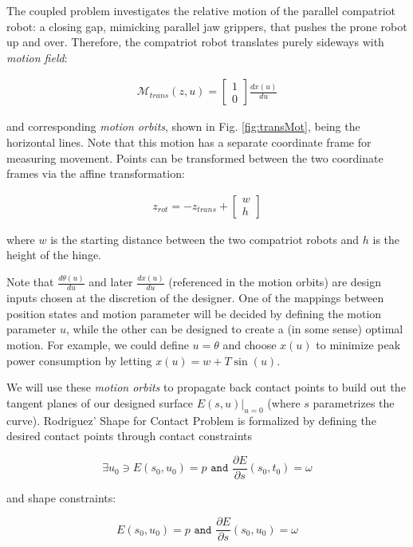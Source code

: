 \documentclass[letterpaper]{report}
\begin{document}
The coupled problem investigates the relative motion of the parallel compatriot robot: a closing gap, mimicking parallel jaw grippers, that pushes the prone robot up and over.
Therefore, the compatriot robot translates purely sideways with \textit{motion field}:

\begin{align}
\mathcal{M}_{trans}(z,u) = \begin{bmatrix} 1 \\ 0 \end{bmatrix} \frac{dx(u)}{du}
\end{align}

and corresponding \textit{motion orbits}, shown in Fig. \ref{fig:transMot}, being the horizontal lines.
Note that this motion has a separate coordinate frame for measuring movement.
Points can be transformed between the two coordinate frames via the affine transformation:

\begin{align}
 z_{rot}=-z_{trans}+\begin{bmatrix}w \\ h\end{bmatrix}
\end{align}

where $w$ is the starting distance between the two compatriot robots and $h$ is the height of the hinge.

Note that $\frac{d\theta(u)}{du}$ and later $\frac{dx(u)}{du}$ (referenced in the motion orbits) are design inputs chosen at the discretion of the designer.
One of the mappings between position states and motion parameter will be decided by defining the motion parameter $u$, while the other can be designed to create a (in some sense) optimal motion.
For example, we could define $u=\theta$ and choose $x(u)$ to minimize peak power consumption by letting $x(u) = w + T \sin(u)$.

We will use these \textit{motion orbits} to propagate back contact points to build out the tangent planes of our designed surface $E(s,u)\rvert_{u=0}$ (where $s$ parametrizes the curve).
Rodriguez' Shape for Contact Problem is formalized by defining the desired contact points through contact constraints

$$\exists u_0 \ni E(s_0,u_0) = p \texttt{ and } \frac{\partial E}{\partial s}(s_0,t_0) = \omega$$

and shape constraints:

$$E(s_0,u_0) = p \texttt{ and } \frac{\partial E}{\partial s}(s_0,u_0) = \omega$$
\end{document}
